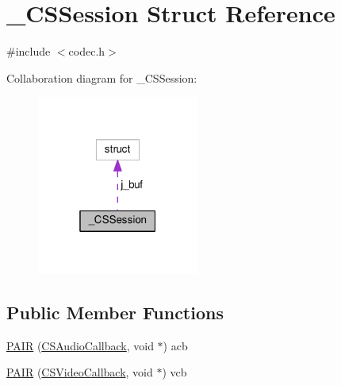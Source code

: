 \hypertarget{struct___c_s_session}{\section{\+\_\+\+C\+S\+Session Struct Reference}
\label{struct___c_s_session}
}


{\ttfamily \#include $<$codec.\+h$>$}



Collaboration diagram for \+\_\+\+C\+S\+Session\+:
\nopagebreak
\begin{figure}[H]
\begin{center}
\leavevmode
\includegraphics[width=151pt]{de/d9c/struct___c_s_session__coll__graph}
\end{center}
\end{figure}
\subsection*{Public Member Functions}
\begin{DoxyCompactItemize}
\item 
\hyperlink{struct___c_s_session_a386fcae0e3f3ef0fcd8b2c401a7a25e5}{P\+A\+I\+R} (\hyperlink{codec_8h_a8691fa90576893d362f5f6de54fd14bc}{C\+S\+Audio\+Callback}, void $\ast$) acb
\item 
\hyperlink{struct___c_s_session_a68cfb40772f235c4c4649ca156cea307}{P\+A\+I\+R} (\hyperlink{codec_8h_ae896ea9d370c352c0a0fa7f0341f8e2e}{C\+S\+Video\+Callback}, void $\ast$) vcb
\end{DoxyCompactItemize}
